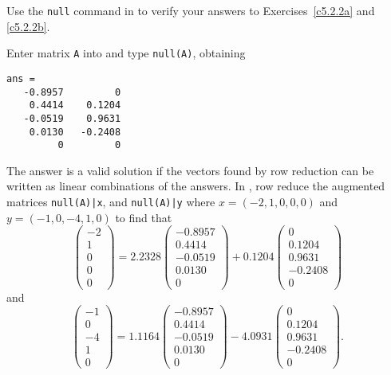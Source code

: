 \documentclass{ximera}
\begin{document}
\begin{exercise} \label{c5.3.2}
Use the {\tt null} command in \Matlab to verify your answers to
Exercises~\ref{c5.2.2a} and \ref{c5.2.2b}.

\begin{solution}

Enter matrix {\tt A} into \Matlab and type {\tt null(A)}, obtaining
\begin{verbatim}
ans =
   -0.8957         0
    0.4414    0.1204
   -0.0519    0.9631
    0.0130   -0.2408
         0         0
\end{verbatim}
The \Matlab answer is a valid solution if the vectors found
by row reduction can be written as linear combinations of the \Matlab
answers.  In \Matlab, row reduce the augmented matrices {\tt null(A)|x},
and {\tt null(A)|y} where $x = (-2,1,0,0,0)$ and $y = (-1,0,-4,1,0)$ 
to find that
\[
\left(\begin{array}{r} -2 \\ 1 \\ 0 \\ 0 \\ 0 \end{array}\right) =
2.2328\left(\begin{array}{r} -0.8957 \\ 0.4414 \\ -0.0519 \\ 0.0130 \\ 0
\end{array}\right) + 0.1204\left(\begin{array}{r} 0 \\ 0.1204 \\ 0.9631 \\
-0.2408 \\ 0 \end{array}\right)
\]
and
\[
\left(\begin{array}{r} -1 \\ 0 \\ -4 \\ 1 \\ 0 \end{array}\right) =
1.1164\left(\begin{array}{r} -0.8957 \\ 0.4414 \\ -0.0519 \\ 0.0130 \\ 0
\end{array}\right) - 4.0931\left(\begin{array}{r} 0 \\ 0.1204 \\ 0.9631 \\
-0.2408 \\ 0 \end{array}\right).
\]


\end{solution}
\end{exercise}
\end{document}
